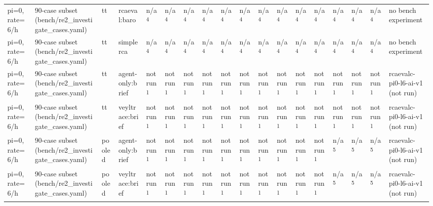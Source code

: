 \begin{table}[t]
\begin{tabular}{llllllllllllllllll}
pi=0, rate=6/h & 90-case subset (bench/re2\_investigate\_cases.yaml) & tt & rcaeval:baro & n/a\textsuperscript{4} & n/a\textsuperscript{4} & n/a\textsuperscript{4} & n/a\textsuperscript{4} & n/a\textsuperscript{4} & n/a\textsuperscript{4} & n/a\textsuperscript{4} & n/a\textsuperscript{4} & n/a\textsuperscript{4} & n/a\textsuperscript{4} & n/a\textsuperscript{4} & n/a\textsuperscript{4} & n/a\textsuperscript{4} & no bench experiment \\
pi=0, rate=6/h & 90-case subset (bench/re2\_investigate\_cases.yaml) & tt & simplerca & n/a\textsuperscript{4} & n/a\textsuperscript{4} & n/a\textsuperscript{4} & n/a\textsuperscript{4} & n/a\textsuperscript{4} & n/a\textsuperscript{4} & n/a\textsuperscript{4} & n/a\textsuperscript{4} & n/a\textsuperscript{4} & n/a\textsuperscript{4} & n/a\textsuperscript{4} & n/a\textsuperscript{4} & n/a\textsuperscript{4} & no bench experiment \\
pi=0, rate=6/h & 90-case subset (bench/re2\_investigate\_cases.yaml) & tt & agent-only:brief & not run\textsuperscript{1} & not run\textsuperscript{1} & not run\textsuperscript{1} & not run\textsuperscript{1} & not run\textsuperscript{1} & not run\textsuperscript{1} & not run\textsuperscript{1} & not run\textsuperscript{1} & not run\textsuperscript{1} & not run\textsuperscript{1} & not run\textsuperscript{1} & not run\textsuperscript{1} & not run\textsuperscript{1} & rcaevalc-pi0-l6-ai-v1 (not run) \\
pi=0, rate=6/h & 90-case subset (bench/re2\_investigate\_cases.yaml) & tt & veyltrace:brief & not run\textsuperscript{1} & not run\textsuperscript{1} & not run\textsuperscript{1} & not run\textsuperscript{1} & not run\textsuperscript{1} & not run\textsuperscript{1} & not run\textsuperscript{1} & not run\textsuperscript{1} & not run\textsuperscript{1} & not run\textsuperscript{1} & not run\textsuperscript{1} & not run\textsuperscript{1} & not run\textsuperscript{1} & rcaevalc-pi0-l6-ai-v1 (not run) \\
pi=0, rate=6/h & 90-case subset (bench/re2\_investigate\_cases.yaml) & pooled & agent-only:brief & not run\textsuperscript{1} & not run\textsuperscript{1} & not run\textsuperscript{1} & not run\textsuperscript{1} & not run\textsuperscript{1} & not run\textsuperscript{1} & not run\textsuperscript{1} & not run\textsuperscript{1} & not run\textsuperscript{1} & not run\textsuperscript{1} & n/a\textsuperscript{5} & n/a\textsuperscript{5} & n/a\textsuperscript{5} & rcaevalc-pi0-l6-ai-v1 (not run) \\
pi=0, rate=6/h & 90-case subset (bench/re2\_investigate\_cases.yaml) & pooled & veyltrace:brief & not run\textsuperscript{1} & not run\textsuperscript{1} & not run\textsuperscript{1} & not run\textsuperscript{1} & not run\textsuperscript{1} & not run\textsuperscript{1} & not run\textsuperscript{1} & not run\textsuperscript{1} & not run\textsuperscript{1} & not run\textsuperscript{1} & n/a\textsuperscript{5} & n/a\textsuperscript{5} & n/a\textsuperscript{5} & rcaevalc-pi0-l6-ai-v1 (not run) \\

\end{tabular}
\end{table}
